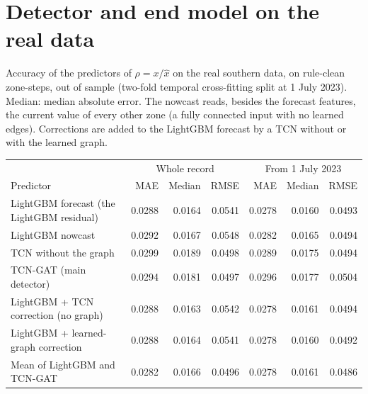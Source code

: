 \documentclass[11pt,a4paper]{article}
\makeatletter
\newenvironment{stable}{\par\addvspace{8pt}\noindent\begin{minipage}{\textwidth}\def\@captype{table}\centering}{\end{minipage}\par\addvspace{8pt}}
\makeatother
\begin{document}
\section{Detector and end model on the real data}\label{sec:s-detector}
\begin{stable}
\caption{Accuracy of the predictors of $\rho = x/\hat{x}$ on the real southern data, on rule-clean zone-steps, out of sample (two-fold temporal cross-fitting split at 1 July 2023). Median: median absolute error. The nowcast reads, besides the forecast features, the current value of every other zone (a fully connected input with no learned edges). Corrections are added to the LightGBM forecast by a TCN without or with the learned graph.}\label{tab:s-predictors}
\footnotesize\setlength{\tabcolsep}{4pt}
\begin{tabular}{@{}l r r r r r r@{}}
\toprule
 & \multicolumn{3}{c}{Whole record} & \multicolumn{3}{c}{From 1 July 2023} \\
\cmidrule(lr){2-4}\cmidrule(lr){5-7}
Predictor & MAE & Median & RMSE & MAE & Median & RMSE \\
\midrule
LightGBM forecast (the LightGBM residual) & 0.0288 & 0.0164 & 0.0541 & 0.0278 & 0.0160 & 0.0493 \\
LightGBM nowcast & 0.0292 & 0.0167 & 0.0548 & 0.0282 & 0.0165 & 0.0494 \\
TCN without the graph & 0.0299 & 0.0189 & 0.0498 & 0.0289 & 0.0175 & 0.0494 \\
TCN-GAT (main detector) & 0.0294 & 0.0181 & 0.0497 & 0.0296 & 0.0177 & 0.0504 \\
LightGBM + TCN correction (no graph) & 0.0288 & 0.0163 & 0.0542 & 0.0278 & 0.0161 & 0.0494 \\
LightGBM + learned-graph correction & 0.0288 & 0.0164 & 0.0541 & 0.0278 & 0.0160 & 0.0492 \\
Mean of LightGBM and TCN-GAT & 0.0282 & 0.0166 & 0.0496 & 0.0278 & 0.0161 & 0.0486 \\
\bottomrule
\end{tabular}
\end{stable}
\end{document}
